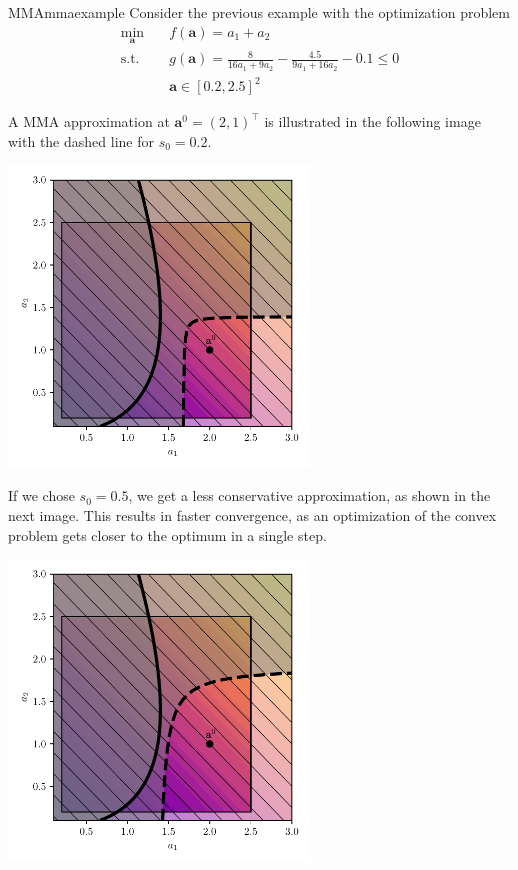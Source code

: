 \begin{example}{MMA}{mmaexample}
    Consider the previous example with the optimization problem
    \begin{equation}
        \begin{aligned}
            \min_{\mathbf{a}} \quad & f(\mathbf{a})= a_1 + a_2\\
            \textrm{s.t.} \quad     & g(\mathbf{a}) = \frac{8}{16a_1+9a_2} - \frac{4.5}{9a_1+16a_2} -0.1 \le 0  \\
            \quad     & \mathbf{a} \in [0.2,2.5]^2
        \end{aligned}
    \end{equation}

    A MMA approximation at $\mathbf{a}^0=(2,1)^\top$ is illustrated in the following image with the dashed line for $s_0=0.2$. 
    \begin{center}
        \includegraphics[width=0.6\textwidth]{figures/four_bar_example_mma_0.pdf}
    \end{center}

    If we chose $s_0=0.5$, we get a less conservative approximation, as shown in the next image. This results in faster convergence, as an optimization of the convex problem gets closer to the optimum in a single step.
    \begin{center}
        \includegraphics[width=0.6\textwidth]{figures/four_bar_example_mma_1.pdf}
    \end{center}


\end{example}
